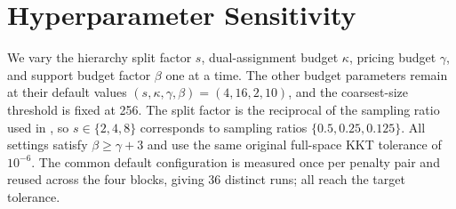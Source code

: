\section{Hyperparameter Sensitivity}
\label{app:uot-parameter-sensitivity}

We vary the hierarchy split factor $s$, dual-assignment budget $\kappa$, pricing budget $\gamma$, and support budget factor $\beta$ one at a time.
The other budget parameters remain at their default values $(s,\kappa,\gamma,\beta)=(4,16,2,10)$, and the coarsest-size threshold is fixed at 256.
The split factor is the reciprocal of the sampling ratio used in \hello, so $s\in\{2,4,8\}$ corresponds to sampling ratios $\{0.5,0.25,0.125\}$.
All settings satisfy $\beta\geq\gamma+3$ and use the same original full-space KKT tolerance of $10^{-6}$.
The common default configuration is measured once per penalty pair and reused across the four blocks, giving 36 distinct runs; all reach the target tolerance.

